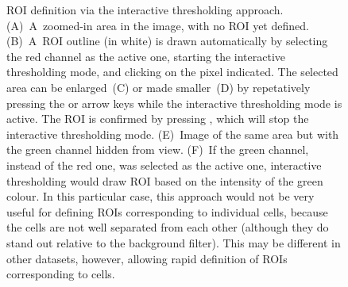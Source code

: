 \begin{figure}[!ht]
\begin{tabular}{cccccc}
\end{tabular}
\caption{\label{fig:roi-interactive5}%
ROI definition via the interactive thresholding approach. (A)~A~zoomed-in area in the image, with no ROI yet defined. (B)~A~ROI outline (in white) is drawn automatically by selecting the red channel as the active one, starting the interactive thresholding mode, and clicking on the pixel indicated. The selected area can be enlarged~(C) or made smaller~(D) by repetatively pressing the  or  arrow keys while the interactive thresholding mode is active. The ROI is confirmed by pressing , which will stop the interactive thresholding mode. (E)~Image of the same area but with the green channel hidden from view. (F)~If the green channel, instead of the red one, was selected as the active one, interactive thresholding would draw ROI based on the intensity of the green colour. In this particular case, this approach would not be very useful for defining ROIs corresponding to individual cells, because the cells are not well separated from each other (although they do stand out relative to the background filter). This may be different in other datasets, however, allowing rapid definition of ROIs corresponding to cells.}
\end{figure}






